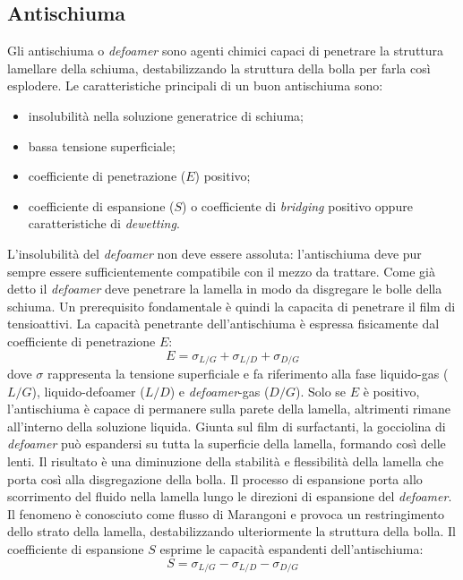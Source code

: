 \subsection{Antischiuma}
Gli antischiuma o \textit{defoamer} sono agenti chimici capaci di penetrare la struttura lamellare della schiuma, destabilizzando la struttura della bolla per farla così esplodere. Le caratteristiche principali di un buon antischiuma sono:
\begin{itemize}
    \item insolubilità nella soluzione generatrice di schiuma;
    \item bassa tensione superficiale;
    \item coefficiente di penetrazione (\(E\)) positivo;
    \item coefficiente di espansione (\(S\)) o coefficiente di \textit{bridging} positivo oppure caratteristiche di \textit{dewetting}.
\end{itemize}

L'insolubilità del \textit{defoamer} non deve essere assoluta: l'antischiuma deve pur sempre essere sufficientemente compatibile con il mezzo da trattare. 
Come già detto il \textit{defoamer} deve penetrare la lamella in modo da disgregare le bolle della schiuma. Un prerequisito fondamentale è quindi la capacita di penetrare il film di tensioattivi. La capacità penetrante dell'antischiuma è espressa fisicamente dal coefficiente di penetrazione \(E\):
\[E = \sigma_{L/G} + \sigma_{L/D} + \sigma_{D/G} \label{eq:penetration} \]
dove \(\sigma\) rappresenta la tensione superficiale e fa riferimento alla fase liquido-gas (\(L/G\)), liquido-defoamer (\(L/D\)) e \textit{defoamer}-gas (\(D/G\)). Solo se \(E\) è positivo, l'antischiuma è capace di permanere sulla parete della lamella, altrimenti rimane all'interno della soluzione liquida. Giunta sul film di surfactanti,  la gocciolina di \textit{defoamer} può espandersi su tutta la superficie della lamella, formando così delle lenti. Il risultato è una diminuzione della stabilità e flessibilità della lamella che porta così alla disgregazione della bolla. Il processo di espansione porta allo scorrimento del fluido nella lamella lungo le direzioni di espansione del \textit{defoamer}. Il fenomeno è conosciuto come flusso di Marangoni e provoca un restringimento dello strato della lamella, destabilizzando ulteriormente la struttura della bolla. Il coefficiente di espansione \(S\) esprime le capacità espandenti dell'antischiuma:
\[S = \sigma_{L/G} - \sigma_{L/D} - \sigma_{D/G} \label{eq:spreading} \]

